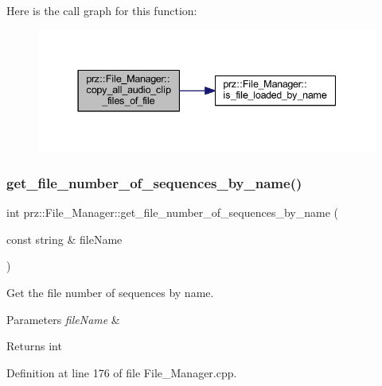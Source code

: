 Here is the call graph for this function\+:
\nopagebreak
\begin{figure}[H]
\begin{center}
\leavevmode
\includegraphics[width=337pt]{classprz_1_1_file___manager_a56563f65f4b2cfa34e4393ae34a0afd3_cgraph}
\end{center}
\end{figure}
\mbox{\label{classprz_1_1_file___manager_abdabf8d32f9cca2d8cda41cdd7841312}} 
\subsubsection{\texorpdfstring{get\_file\_number\_of\_sequences\_by\_name()}{get\_file\_number\_of\_sequences\_by\_name()}}
{\footnotesize\ttfamily int prz\+::\+File\+\_\+\+Manager\+::get\+\_\+file\+\_\+number\+\_\+of\+\_\+sequences\+\_\+by\+\_\+name (\begin{DoxyParamCaption}\item[{const string \&}]{file\+Name }\end{DoxyParamCaption})}



Get the file number of sequences by name. 


\begin{DoxyParams}{Parameters}
{\em file\+Name} & \\
\hline
\end{DoxyParams}
\begin{DoxyReturn}{Returns}
int 
\end{DoxyReturn}


Definition at line 176 of file File\+\_\+\+Manager.\+cpp.

